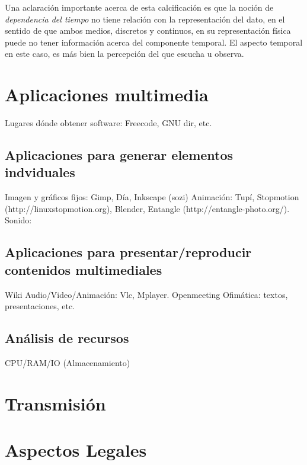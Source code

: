 \documentclass[12pt]{article}
\begin{document}
Una aclaración importante acerca de esta calcificación es que la noción 
de {\it dependencia del tiempo} no tiene relación con la representación
del dato, en el sentido de que ambos medios, discretos y continuos, en su 
representación física puede no tener información acerca del componente 
temporal. El aspecto temporal en este caso, es más bien la percepción del 
que escucha u observa.\cite{ramyer}  

\section*{Aplicaciones multimedia}

Lugares dónde obtener software: Freecode, GNU dir, etc. 

\subsection*{Aplicaciones para generar elementos indviduales}
Imagen y gráficos fijos: Gimp, Día, Inkscape (sozi)
Animación: Tupí, Stopmotion (http://linuxstopmotion.org), Blender, 
Entangle (http://entangle-photo.org/).
Sonido:  

\subsection*{Aplicaciones para presentar/reproducir contenidos multimediales}
Wiki
Audio/Video/Animación: Vlc, Mplayer. 
Openmeeting
Ofimática: textos, presentaciones, etc. 

\subsection{Análisis de recursos}
CPU/RAM/IO (Almacenamiento)

\section*{Transmisión}


\section*{Aspectos Legales}
\end{document}
